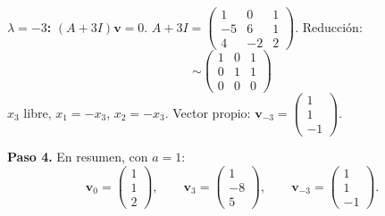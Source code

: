\begin{prob}
\begin{myproof}
\textbf{$\lambda=-3$:} $(A+3I)\mathbf{v}=0$. $A+3I=\begin{pmatrix}1&0&1\\-5&6&1\\4&-2&2\end{pmatrix}$. Reducción:
\[
\sim \begin{pmatrix}1&0&1\\0&1&1\\0&0&0\end{pmatrix}
\]
$x_3$ libre, $x_1=-x_3$, $x_2=-x_3$. Vector propio: $\mathbf{v}_{-3}=\begin{pmatrix}1\\1\\-1\end{pmatrix}$.

\textbf{Paso 4.} En resumen, con $a=1$:
\[
\boxed{\mathbf{v}_0=\begin{pmatrix}1\\1\\2\end{pmatrix},\qquad \mathbf{v}_3=\begin{pmatrix}1\\-8\\5\end{pmatrix},\qquad \mathbf{v}_{-3}=\begin{pmatrix}1\\1\\-1\end{pmatrix}.}
\]
\end{myproof}
\end{prob}

